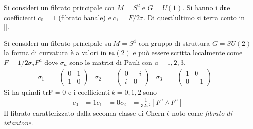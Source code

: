 \begin{example}\label{ex:monopolechern}
   Si consideri un fibrato principale con $M = S^2$ e $G = U(1)$. Si hanno i due
   coefficienti $c_0 = 1$ (fibrato banale) e $c_1 = F/2\pi$. Di quest'ultimo si
   terra conto in \ref{}.\\
\end{example}

\begin{example}\label{ex:istantonchern}
   Si consideri un fibrato principale su $M = S^4$ con gruppo di struttura
   $G = SU(2)$ la forma di curvatura è a valori in $\mathfrak{su(2)}$ e può
   essere scritta localmente come $F = 1/2\sigma_a F^a$ dove $\sigma_a$ sono le
   matrici di Pauli con $a = 1,2,3$.
   \begin{equation}
      \begin{aligned}
         \sigma_1 &= \begin{pmatrix} 0 & 1  \\ 1 & 0  \end{pmatrix}&
         \sigma_2 &= \begin{pmatrix} 0 & -i \\ i & 0  \end{pmatrix}&
         \sigma_3 &= \begin{pmatrix} 1 & 0  \\ 0 & -1 \end{pmatrix}&
      \end{aligned}
   \end{equation}
   Si ha quindi trF = 0 e i coefficienti $k = 0,1,2$ sono
   \begin{equation}
      \begin{aligned}
         c_0 & = 1
         c_1 & = 0
         c_2 & = \frac{1}{32\pi^2}[ F^a \wedge F^a ]
      \end{aligned}
   \end{equation}
   Il fibrato caratterizzato dalla seconda classe di Chern è noto come
   \emph{fibrato di istantone}.
\end{example}

